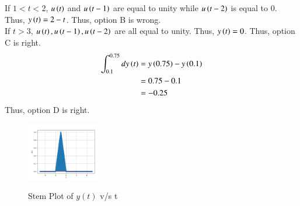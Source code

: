 \documentclass[journal,12pt,twocolumn]{IEEEtran}
\theoremstyle{remark}
\begin{document}
If $1<t<2$, $u\left(t\right)$ and $u\left(t-1\right)$ are equal to unity while $u\left(t-2\right)$ is equal to 0. Thus, $y\left(t\right) = 2-t$. Thus, option B is wrong.\\

If $t>3$, $u\left(t\right), u\left(t-1\right), u\left(t-2\right)$ are all equal to unity. Thus, $y\left(t\right) = 0$. Thus, option C is right.\\

\begin{align}
    \int_{0.1} ^ {0.75} dy\left(t\right) &= y\left(0.75\right) - y\left(0.1\right) \\
    &= 0.75 - 0.1\\
    &= -0.25
\end{align}
Thus, option D is right.\\
\begin{figure}[h]
    \includegraphics[width=0.3\textwidth]{figs/y(t)_vs_t.png}\label{fig:y(t)_vs_t}
    \caption{Stem Plot of $y(t)$ v/s t}
\end{figure}
\end{document}
